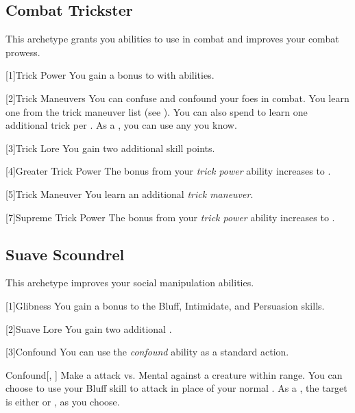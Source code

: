     \subsection{Combat Trickster}
        This archetype grants you abilities to use in combat and improves your combat prowess.

        [1]{Trick Power} You gain a  bonus to  with  abilities.

        [2]{Trick Maneuvers}
        You can confuse and confound your foes in combat.
        You learn one  from the trick maneuver list (see ).
        You can also spend  to learn one additional trick  per .
        As a , you can use any  you know.

        [3]{Trick Lore} You gain two additional skill points.

        [4]{Greater Trick Power} The bonus from your \textit{trick power} ability increases to .

        [5]{Trick Maneuver}
        You learn an additional \textit{trick maneuver}.


        [7]{Supreme Trick Power}
        The bonus from your \textit{trick power} ability increases to .

    \subsection{Suave Scoundrel}
        This archetype improves your social manipulation abilities.

        [1]{Glibness} You gain a  bonus to the Bluff, Intimidate, and Persuasion skills.

        [2]{Suave Lore} You gain two additional .

        [3]{Confound} You can use the \textit{confound} ability as a standard action.
        \begin{apability}{Confound}[, ]
            Make a attack vs. Mental against a creature within \rngclose range.
            You can choose to use your Bluff skill to attack in place of your normal .
            \hit As a , the target is either  or , as you choose.
        \end{apability}

